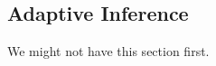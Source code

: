 \subsection{Adaptive Inference}
\label{label:subsec:adpative_inference}
We might not have this section first.
